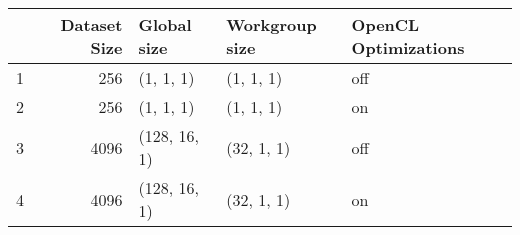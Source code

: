 \begin{tabular}{lrlll}
\toprule
{} &  Dataset Size &   Global size & Workgroup size & OpenCL Optimizations \\
\midrule
1 &           256 &     (1, 1, 1) &      (1, 1, 1) &                  off \\
2 &           256 &     (1, 1, 1) &      (1, 1, 1) &                   on \\
3 &          4096 &  (128, 16, 1) &     (32, 1, 1) &                  off \\
4 &          4096 &  (128, 16, 1) &     (32, 1, 1) &                   on \\
\bottomrule
\end{tabular}
